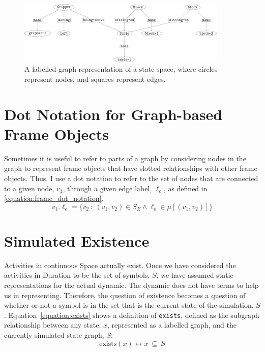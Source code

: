 \begin{figure}
\includegraphics[width=10cm]{gfx/simulation_example_state}
\caption[A labelled graph representation of a state space.]{A labelled graph representation of a state space, where circles represent nodes, and squares represent edges.}
\label{figure:simulation_example_state}
\end{figure}

\section{Dot Notation for Graph-based Frame Objects}

Sometimes it is useful to refer to parts of a graph by considering
nodes in the graph to represent frame objects that have slotted
relationships with other frame objects.  Thus, I use a dot notation to
refer to the set of nodes that are connected to a given node, $v_1$,
through a given edge label, $\ell_e$, as defined in
{\mbox{\autoref{equation:frame_dot_notation}}}.
\begin{equation}
\label{equation:frame_dot_notation}
v_1.\ell_e = \{v_2 ~:~ (v_1, v_2) \in S_E \wedge \ell_e \in \mu[(v_1, v_2)]\}
\end{equation}

\section{Simulated Existence}

Activities in continuous Space actually exist.  Once we have
considered the activities in Duration to be the set of symbols, $S$,
we have assumed static representations for the actual dynamic.  The
dynamic does not have terms to help us in representing.  Therefore,
the question of existence becomes a question of whether or not a
symbol is in the set that is the current state of the simulation, $S$.
Equation~\ref{equation:exists} shows a definition of {\tt exists},
defined as the subgraph relationship between any state, $x$,
represented as a labelled graph, and the currently simulated state
graph, $S$:
\begin{equation}
\label{equation:exists}
\text{exists}(x) \longleftrightarrow x ~{\subseteq}~ S
\end{equation}

